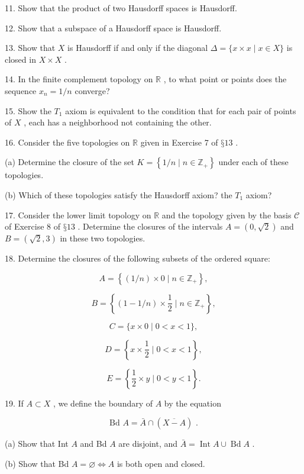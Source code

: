 11. Show that the product of two Hausdorff spaces is Hausdorff.

12. Show that a subspace of a Hausdorff space is Hausdorff.

13. Show that \(X\) is Hausdorff if and only if the diagonal \(\Delta  = \{ x \times  x \mid  x \in  X\}\) is closed in \(X \times  X\) .

14. In the finite complement topology on \(\mathbb{R}\) , to what point or points does the sequence \({x}_{n} = 1/n\) converge?

15. Show the \({T}_{1}\) axiom is equivalent to the condition that for each pair of points of \(X\) , each has a neighborhood not containing the other.

16. Consider the five topologies on \(\mathbb{R}\) given in Exercise 7 of \(§{13}\) .

(a) Determine the closure of the set \(K = \left\{  {1/n \mid  n \in  {\mathbb{Z}}_{ + }}\right\}\) under each of these topologies.

(b) Which of these topologies satisfy the Hausdorff axiom? the \({T}_{1}\) axiom?

17. Consider the lower limit topology on \(\mathbb{R}\) and the topology given by the basis \(\mathcal{C}\) of Exercise 8 of \(§{13}\) . Determine the closures of the intervals \(A = \left( {0,\sqrt{2}}\right)\) and \(B = \left( {\sqrt{2},3}\right)\) in these two topologies.

18. Determine the closures of the following subsets of the ordered square:

\[
A = \left\{  {\left( {1/n}\right)  \times  0 \mid  n \in  {\mathbb{Z}}_{ + }}\right\}  ,
\]

\[
B = \left\{  {\left( {1 - 1/n}\right)  \times  \frac{1}{2} \mid  n \in  {\mathbb{Z}}_{ + }}\right\}  ,
\]

\[
C = \{ x \times  0 \mid  0 < x < 1\} ,
\]

\[
D = \left\{  {x \times  \frac{1}{2} \mid  0 < x < 1}\right\}  ,
\]

\[
E = \left\{  {\frac{1}{2} \times  y \mid  0 < y < 1}\right\}  .
\]

19. If \(A \subset  X\) , we define the boundary of \(A\) by the equation

\[
\text{ Bd }A = \bar{A} \cap  \left( \overline{X - A}\right) \text{ . }
\]

(a) Show that Int \(A\) and Bd \(A\) are disjoint, and \(\bar{A} = \operatorname{Int}A \cup  \operatorname{Bd}A\) .

(b) Show that Bd \(A = \varnothing  \Leftrightarrow  A\) is both open and closed.

